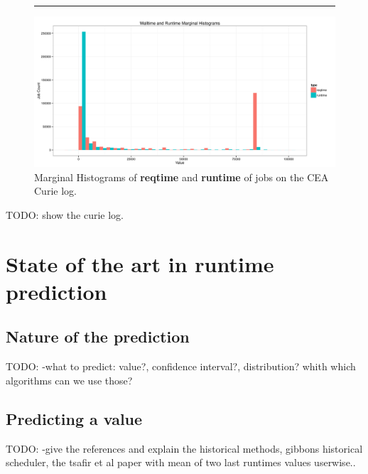 \documentclass{article}
\begin{document}
\begin{figure}[b]
  \centering\rule{0.8*\textwidth}{0.3*\textwidth}

        \includegraphics[width=\textwidth]{../../wallimage-0.png}
        \caption{Marginal Histograms of \textbf{reqtime} and \textbf{runtime} of jobs on the CEA Curie log.}
\label{fig:_wall_run_for_report_pdf}
\end{figure}





TODO: show the curie log.



\section{State of the art in \textbf{runtime} prediction}


\subsection{Nature of the prediction}
\label{sub:nature_of_the_prediction}

TODO: -what to predict: value?, confidence interval?, distribution? whith which algorithms can we use those?


\subsection{Predicting a value}
\label{sub:predicting_a_value}

TODO: -give the references and explain the historical methods, gibbons historical scheduler, the tsafir et al paper with mean of two last runtimes values userwise..

\end{document}
